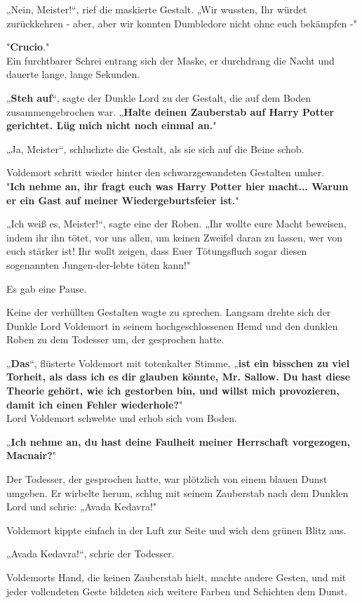 {„Nein, Meister!“, rief die maskierte Gestalt. „Wir wussten, Ihr würdet zurückkehren - aber, aber wir konnten Dumbledore nicht ohne euch bekämpfen -"

"\textbf{Crucio}."\\ Ein furchtbarer Schrei entrang sich der Maske, er durchdrang die Nacht und dauerte lange, lange Sekunden.

„\textbf{Steh auf}“, sagte der Dunkle Lord zu der Gestalt, die auf dem Boden zusammengebrochen war. „\textbf{Halte deinen Zauberstab auf Harry Potter gerichtet. Lüg mich nicht noch einmal an.}"

„Ja, Meister“, schluchzte die Gestalt, als sie sich auf die Beine schob.

Voldemort schritt wieder hinter den schwarzgewandeten Gestalten umher.\\ "\textbf{Ich nehme an, ihr fragt euch was Harry Potter hier macht... Warum er ein Gast auf meiner Wiedergeburtsfeier ist.}"

„Ich weiß es, Meister!“, sagte eine der Roben. „Ihr wollte eure Macht beweisen, indem ihr ihn tötet, vor uns allen, um keinen Zweifel daran zu lassen, wer von euch stärker ist! Ihr wollt zeigen, dass Euer Tötungsfluch sogar diesen sogenannten Jungen-der-lebte töten kann!"

Es gab eine Pause.

Keine der verhüllten Gestalten wagte zu sprechen. Langsam drehte sich der Dunkle Lord Voldemort in seinem hochgeschlossenen Hemd und den dunklen Roben zu dem Todesser um, der gesprochen hatte.

„\textbf{Das}“, flüsterte Voldemort mit totenkalter Stimme, „\textbf{ist ein bisschen zu viel Torheit, als dass ich es dir glauben könnte, Mr. Sallow. Du hast diese Theorie gehört, wie ich gestorben bin, und willst mich provozieren, damit ich einen Fehler wiederhole?}"\\ Lord Voldemort schwebte und erhob sich vom Boden.

„\textbf{Ich nehme an, du hast deine Faulheit meiner Herrschaft vorgezogen, Macnair?}"

Der Todesser, der gesprochen hatte, war plötzlich von einem blauen Dunst umgeben. Er wirbelte herum, schlug mit seinem Zauberstab nach dem Dunklen Lord und schrie: „Avada Kedavra!"

Voldemort kippte einfach in der Luft zur Seite und wich dem grünen Blitz aus.

„Avada Kedavra!“, schrie der Todesser.

Voldemorts Hand, die keinen Zauberstab hielt, machte andere Gesten, und mit jeder vollendeten Geste bildeten sich weitere Farben und Schichten dem Dunst.

}
